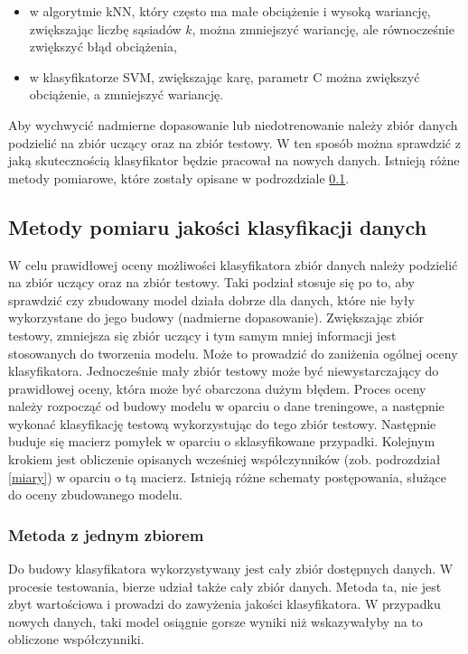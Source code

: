 \begin{itemize}
	\item w algorytmie kNN, który często ma małe obciążenie i wysoką wariancję, zwiększając liczbę sąsiadów $k$, można zmniejszyć wariancję, ale równocześnie zwiększyć błąd obciążenia,
	\item w klasyfikatorze SVM, zwiększając karę, parametr C można zwiększyć obciążenie, a zmniejszyć wariancję.
\end{itemize}
Aby wychwycić nadmierne dopasowanie lub niedotrenowanie należy zbiór danych podzielić na zbiór uczący oraz na zbiór testowy. W ten sposób można sprawdzić z jaką skutecznością klasyfikator będzie pracował na nowych danych. Istnieją różne metody pomiarowe, które zostały opisane w podrozdziale \ref{testowanieklasyfikatora}.

\subsection{Metody pomiaru jakości klasyfikacji danych} \label {testowanieklasyfikatora}
W celu prawidłowej oceny możliwości klasyfikatora zbiór danych należy podzielić na zbiór uczący oraz na zbiór testowy. Taki podział stosuje się po to, aby sprawdzić czy zbudowany model działa dobrze dla danych, które nie były wykorzystane do jego budowy (nadmierne dopasowanie). Zwiększając zbiór testowy, zmniejsza się zbiór uczący i tym samym mniej informacji jest stosowanych do tworzenia modelu. Może to prowadzić do zaniżenia ogólnej oceny klasyfikatora. Jednocześnie mały zbiór testowy może być niewystarczający do prawidłowej oceny, która może być obarczona dużym błędem. Proces oceny należy rozpocząć od budowy modelu w oparciu o dane treningowe, a następnie wykonać klasyfikację testową wykorzystując do tego zbiór testowy. Następnie buduje się macierz pomyłek w oparciu o sklasyfikowane przypadki. Kolejnym krokiem jest obliczenie opisanych wcześniej współczynników (zob. podrozdział \ref*{miary}) w oparciu o tą macierz. Istnieją różne schematy postępowania, służące do oceny zbudowanego modelu.

\subsubsection{Metoda z jednym zbiorem}
Do budowy klasyfikatora wykorzystywany jest cały zbiór dostępnych danych. W procesie testowania, bierze udział także cały zbiór danych. Metoda ta, nie jest zbyt wartościowa i prowadzi do zawyżenia jakości klasyfikatora. W przypadku nowych danych, taki model osiągnie gorsze wyniki niż wskazywałyby na to obliczone współczynniki.

